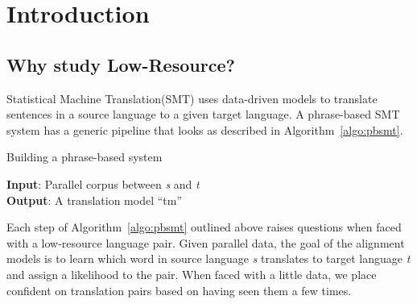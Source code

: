 
%
%

\chapter{Introduction}
\label{sec:introduction}

\section{Why study Low-Resource?}
\label{sec:low_resource}
Statistical Machine Translation(SMT) uses data-driven models to translate sentences in a source language to a given target language. A phrase-based SMT system has a generic pipeline that looks as described in Algorithm~\ref{algo:pbsmt}. 

\begin{algorithm}
\small
\caption{Building a phrase-based system}
\label{algo:pbsmt}
\textbf{Input}: Parallel corpus between \emph{s} and \emph{t} \\
\textbf{Output}: A translation model ``tm'' 
\begin{algorithmic}[l]
	 \label{aline:alignments}
	 \label{aline:scores}
	 \label{aline:MERT}
\end{algorithmic}
\end{algorithm}

Each step of Algorithm~\ref{algo:pbsmt} outlined above raises questions when faced with a low-resource language pair. Given parallel data, the goal of the alignment models is to learn which word in source language \emph{s} translates to target language \emph{t} and assign a likelihood to the pair. When faced with a little data, we place confident on translation pairs based on having seen them a few times. 






